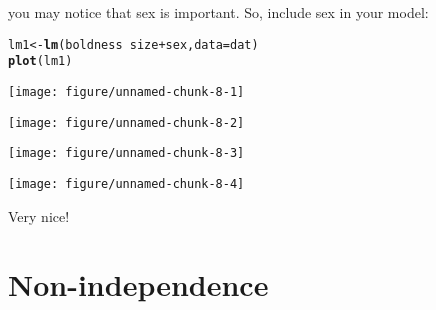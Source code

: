 \documentclass[12pt,a4paper]{scrartcl}\usepackage[]{graphicx}\usepackage[]{color}
\makeatletter
\def\maxwidth{ %
  \ifdim\Gin@nat@width>\linewidth
    \linewidth
  \else
    \Gin@nat@width
  \fi
}
\newcommand{\hlopt}[1]{\textcolor[rgb]{0,0,0}{#1}}%
\newcommand{\hlstd}[1]{\textcolor[rgb]{0.345,0.345,0.345}{#1}}%
\newcommand{\hlkwb}[1]{\textcolor[rgb]{0.69,0.353,0.396}{#1}}%
\newcommand{\hlkwc}[1]{\textcolor[rgb]{0.333,0.667,0.333}{#1}}%
\newcommand{\hlkwd}[1]{\textcolor[rgb]{0.737,0.353,0.396}{\textbf{#1}}}%
\newenvironment{kframe}{%
 \def\at@end@of@kframe{}%
 \ifinner\ifhmode%
  \def\at@end@of@kframe{\end{minipage}}%
  \begin{minipage}{\columnwidth}%
 \fi\fi%
 \def\FrameCommand##1{\hskip\@totalleftmargin \hskip-\fboxsep
 \colorbox{shadecolor}{##1}\hskip-\fboxsep
     \hskip-\linewidth \hskip-\@totalleftmargin \hskip\columnwidth}%
 \MakeFramed {\advance\hsize-\width
   \@totalleftmargin\z@ \linewidth\hsize
   \@setminipage}}%
 {\par\unskip\endMakeFramed%
 \at@end@of@kframe}
\newenvironment{knitrout}{}{} %
\makeatother
\begin{document}
\begin{Answer}
\begin{knitrout}
\end{knitrout}
you may notice that sex is important.
So, include sex in your model:
\begin{knitrout}
\color{fgcolor}\begin{kframe}
\begin{alltt}
\hlstd{lm1} \hlkwb{<-} \hlkwd{lm}\hlstd{(boldness}\hlopt{~}\hlstd{size}\hlopt{+}\hlstd{sex,} \hlkwc{data} \hlstd{= dat)}
\hlkwd{plot}\hlstd{(lm1)}
\end{alltt}
\end{kframe}
\texttt{[image: figure/unnamed-chunk-8-1]} 

\texttt{[image: figure/unnamed-chunk-8-2]} 

\texttt{[image: figure/unnamed-chunk-8-3]} 

\texttt{[image: figure/unnamed-chunk-8-4]} 

\end{knitrout}
Very nice!
\end{Answer}

\section{Non-independence}
\end{document}
